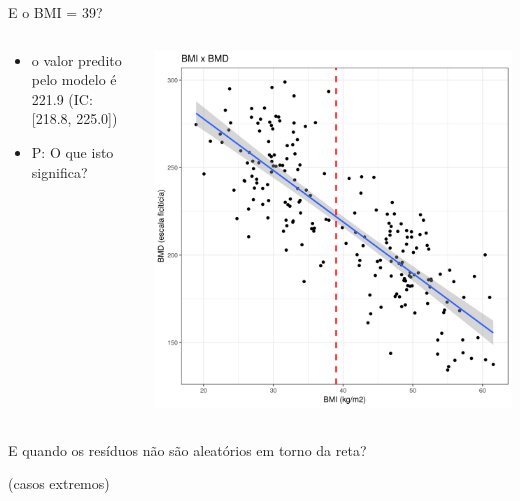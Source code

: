 \documentclass{beamer}
\begin{document}
\begin{frame}{\scriptsize E o BMI = 39?}
  \begin{columns}
    \begin{column}{5cm}
      \begin{itemize}
        \small
      \item o valor predito pelo modelo é 221.9 (IC: [218.8, 225.0])
      \item P: O que isto significa?
      \end{itemize}
    \end{column}
    \begin{column}{5cm}
      \begin{center}
        \includegraphics[width=1.1\textwidth]{Cap18-19/pratica-rls4}
      \end{center}
    \end{column}
  \end{columns}
\end{frame}

\begin{frame}{\scriptsize }
  \begin{center}
    \Large
    E quando os resíduos não são aleatórios em torno da reta?
  \end{center}
  \vfill
  \hfill \footnotesize (casos extremos)
\end{frame}
\end{document}
